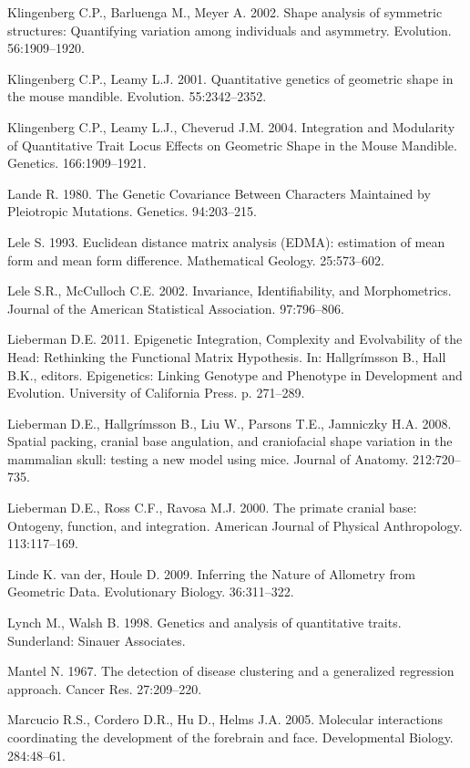 \documentclass[12pt,]{article}
\begin{document}
Klingenberg C.P., Barluenga M., Meyer A. 2002. Shape analysis of
symmetric structures: Quantifying variation among individuals and
asymmetry. Evolution. 56:1909--1920.

Klingenberg C.P., Leamy L.J. 2001. Quantitative genetics of geometric
shape in the mouse mandible. Evolution. 55:2342--2352.

Klingenberg C.P., Leamy L.J., Cheverud J.M. 2004. Integration and
Modularity of Quantitative Trait Locus Effects on Geometric Shape in the
Mouse Mandible. Genetics. 166:1909--1921.

Lande R. 1980. The Genetic Covariance Between Characters Maintained by
Pleiotropic Mutations. Genetics. 94:203--215.

Lele S. 1993. Euclidean distance matrix analysis (EDMA): estimation of
mean form and mean form difference. Mathematical Geology. 25:573--602.

Lele S.R., McCulloch C.E. 2002. Invariance, Identifiability, and
Morphometrics. Journal of the American Statistical Association.
97:796--806.

Lieberman D.E. 2011. Epigenetic Integration, Complexity and Evolvability
of the Head: Rethinking the Functional Matrix Hypothesis. In:
Hallgrímsson B., Hall B.K., editors. Epigenetics: Linking Genotype and
Phenotype in Development and Evolution. University of California Press.
p. 271--289.

Lieberman D.E., Hallgrímsson B., Liu W., Parsons T.E., Jamniczky H.A.
2008. Spatial packing, cranial base angulation, and craniofacial shape
variation in the mammalian skull: testing a new model using mice.
Journal of Anatomy. 212:720--735.

Lieberman D.E., Ross C.F., Ravosa M.J. 2000. The primate cranial base:
Ontogeny, function, and integration. American Journal of Physical
Anthropology. 113:117--169.

Linde K. van der, Houle D. 2009. Inferring the Nature of Allometry from
Geometric Data. Evolutionary Biology. 36:311--322.

Lynch M., Walsh B. 1998. Genetics and analysis of quantitative traits.
Sunderland: Sinauer Associates.

Mantel N. 1967. The detection of disease clustering and a generalized
regression approach. Cancer Res. 27:209--220.

Marcucio R.S., Cordero D.R., Hu D., Helms J.A. 2005. Molecular
interactions coordinating the development of the forebrain and face.
Developmental Biology. 284:48--61.
\end{document}
